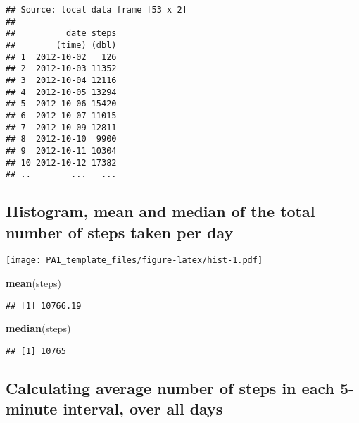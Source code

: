\documentclass[]{article}
\newenvironment{Shaded}{\begin{snugshade}}{\end{snugshade}}
\newcommand{\KeywordTok}[1]{\textcolor[rgb]{0.13,0.29,0.53}{\textbf{{#1}}}}
\newcommand{\DataTypeTok}[1]{\textcolor[rgb]{0.13,0.29,0.53}{{#1}}}
\newcommand{\StringTok}[1]{\textcolor[rgb]{0.31,0.60,0.02}{{#1}}}
\newcommand{\NormalTok}[1]{{#1}}
\begin{document}
\begin{verbatim}
## Source: local data frame [53 x 2]
## 
##          date steps
##        (time) (dbl)
## 1  2012-10-02   126
## 2  2012-10-03 11352
## 3  2012-10-04 12116
## 4  2012-10-05 13294
## 5  2012-10-06 15420
## 6  2012-10-07 11015
## 7  2012-10-09 12811
## 8  2012-10-10  9900
## 9  2012-10-11 10304
## 10 2012-10-12 17382
## ..        ...   ...
\end{verbatim}

\subsection{Histogram, mean and median of the total number of steps
taken per
day}\label{histogram-mean-and-median-of-the-total-number-of-steps-taken-per-day}

\begin{Shaded}
\end{Shaded}

\texttt{[image: PA1\_template\_files/figure-latex/hist-1.pdf]}

\begin{Shaded}
\begin{Highlighting}[]
\KeywordTok{mean}\NormalTok{(steps)}
\end{Highlighting}
\end{Shaded}

\begin{verbatim}
## [1] 10766.19
\end{verbatim}

\begin{Shaded}
\begin{Highlighting}[]
\KeywordTok{median}\NormalTok{(steps)}
\end{Highlighting}
\end{Shaded}

\begin{verbatim}
## [1] 10765
\end{verbatim}

\subsection{Calculating average number of steps in each 5-minute
interval, over all
days}\label{calculating-average-number-of-steps-in-each-5-minute-interval-over-all-days}
\end{document}

